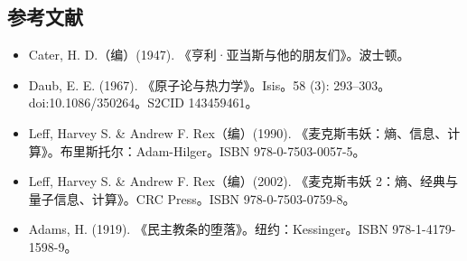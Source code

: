\subsection{参考文献}
\begin{itemize}
\item Cater, H. D.（编）(1947). 《亨利·亚当斯与他的朋友们》。波士顿。
\item Daub, E. E. (1967). 《原子论与热力学》。Isis。58 (3): 293–303。doi:10.1086/350264。S2CID 143459461。
\item Leff, Harvey S. & Andrew F. Rex（编）(1990). 《麦克斯韦妖：熵、信息、计算》。布里斯托尔：Adam-Hilger。ISBN 978-0-7503-0057-5。
\item Leff, Harvey S. & Andrew F. Rex（编）(2002). 《麦克斯韦妖 2：熵、经典与量子信息、计算》。CRC Press。ISBN 978-0-7503-0759-8。
\item Adams, H. (1919). 《民主教条的堕落》。纽约：Kessinger。ISBN 978-1-4179-1598-9。
\end{itemize}

